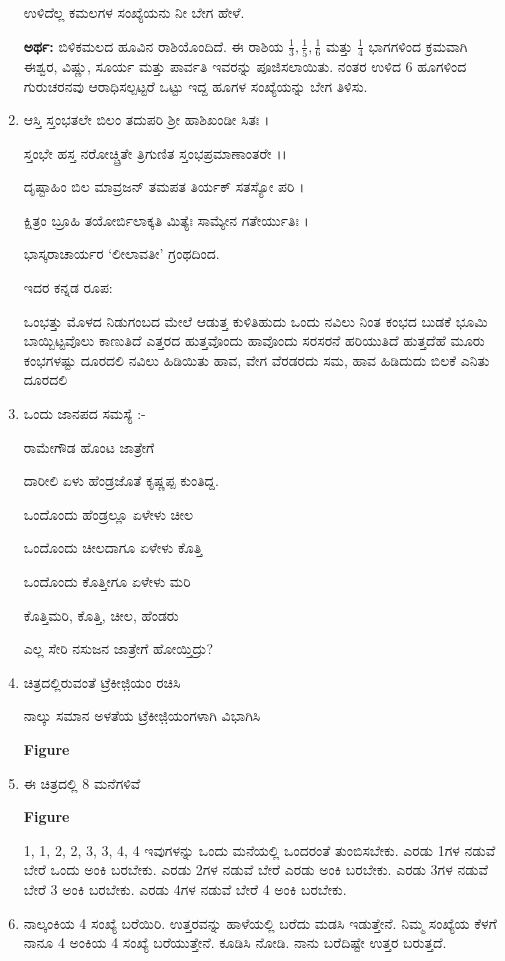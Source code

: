 \begin{enumerate}
 ಉಳಿದೆಲ್ಲ ಕಮಲಗಳ ಸಂಖ್ಯೆಯನು ನೀ ಬೇಗ ಹೇಳೆ.
 
 \smallskip
 {\bf ಅರ್ಥ:} ಬಿಳಿಕಮಲದ ಹೂವಿನ ರಾಶಿಯೊಂದಿದೆ. ಈ ರಾಶಿಯ $\frac{1}{3}, \frac{1}{5}, \frac{1}{6}$ ಮತ್ತು $\frac{1}{4}$ ಭಾಗಗಳಿಂದ ಕ್ರಮವಾಗಿ ಈಶ್ವರ, ವಿಷ್ಣು, ಸೂರ್ಯ ಮತ್ತು ಪಾರ್ವತಿ ಇವರನ್ನು ಪೂಜಿಸಲಾಯಿತು. ನಂತರ ಉಳಿದ 6 ಹೂಗಳಿಂದ ಗುರುಚರನವು ಆರಾಧಿಸಲ್ಪಟ್ಟರೆ ಒಟ್ಟು ಇದ್ದ ಹೂಗಳ ಸಂಖ್ಯೆಯನ್ನು ಬೇಗ ತಿಳಿಸು. 
 
 \item ಆಸ್ತಿ ಸ್ತಂಭತಲೇ ಬಿಲಂ ತದುಪರಿ ಶ್ರೀ ಹಾಶಿಖಂಡೀ ಸಿತಃ ।
 
 ಸ್ತಂಭೇ ಹಸ್ತ ನರೋಚ್ಚ್ರಿತೇ ತ್ರಿಗುಣಿತ ಸ್ತಂಭಪ್ರಮಾಣಾಂತರೇ ।।
 
 ದೃಷ್ಟಾಹಿಂ ಬಿಲ ಮಾವ್ರಜನ್ ತಮಪತ ತಿರ್ಯಕ್ ಸತಸ್ಯೋ ಪರಿ ।
 
 ಕ್ಷಿತ್ರಂ ಬ್ರೂಹಿ ತಯೋರ್ಬಿಲಾಕ್ಕತಿ ಮಿತ್ಯೆಃ ಸಾಮ್ಯೇನ ಗತೇರ್ಯುತಿಃ ।
 
 \hfill ಭಾಸ್ಕರಾಚಾರ್ಯರ ‘ಲೀಲಾವತೀ’ ಗ್ರಂಥದಿಂದ.
  
 \smallskip
 ಇದರ ಕನ್ನಡ ರೂಪ:
 
 ಒಂಭತ್ತು ಮೊಳದ ನಿಡುಗಂಬದ ಮೇಲೆ ಆಡುತ್ತ ಕುಳಿತಿಹುದು ಒಂದು ನವಿಲು ನಿಂತ ಕಂಭದ ಬುಡಕೆ ಭೂಮಿ ಬಾಯ್ಬಿಟ್ಟವೊಲು ಕಾಣುತಿದೆ ಎತ್ತರದ ಹುತ್ತವೊಂದು ಹಾವೊಂದು ಸರಸರನೆ ಹರಿಯುತಿದೆ ಹುತ್ತದೆಹೆ ಮೂರು ಕಂಭಗಳಷ್ಟು ದೂರದಲಿ ನವಿಲು ಹಿಡಿಯಿತು ಹಾವ, ವೇಗ ವೆರಡರದು ಸಮ, ಹಾವ ಹಿಡಿದುದು ಬಿಲಕೆ ಎನಿತು ದೂರದಲಿ
 
 \item ಒಂದು ಜಾನಪದ ಸಮಸ್ಯೆ :-
 
ರಾಮೇಗೌಡ ಹೊಂಟ ಜಾತ್ರೇಗೆ 
 
ದಾರೀಲಿ ಏಳು ಹೆಂಡ್ರಜೊತೆ ಕೃಷ್ಣಪ್ಪ ಕುಂತಿದ್ದ. 
 
ಒಂದೊಂದು ಹೆಂಡ್ರಲ್ಲೂ ಏಳೇಳು ಚೀಲ 
 
ಒಂದೊಂದು ಚೀಲದಾಗೂ ಏಳೇಳು ಕೊತ್ತಿ 
 
ಒಂದೊಂದು ಕೊತ್ತೀಗೂ ಏಳೇಳು ಮರಿ

ಕೊತ್ತಿಮರಿ, ಕೊತ್ತಿ, ಚೀಲ, ಹೆಂಡರು 

ಎಲ್ಲ ಸೇರಿ ನಸುಜನ ಜಾತ್ರೇಗೆ ಹೋಯ್ತಿದ್ರು? 

\item ಚಿತ್ರದಲ್ಲಿರುವಂತೆ ಟ್ರೆಕೀಜಿ಼ಯಂ ರಚಿಸಿ 

ನಾಲ್ಕು ಸಮಾನ ಅಳತೆಯ ಟ್ರೆಕೀಜಿ಼ಯಂಗಳಾಗಿ ವಿಭಾಗಿಸಿ 

\begin{center}
{\bf Figure}
\end{center}
 
 \item ಈ ಚಿತ್ರದಲ್ಲಿ 8 ಮನೆಗಳಿವೆ 
 
 \begin{center}
{\bf Figure}
\end{center}

1, 1, 2, 2, 3, 3, 4, 4 ಇವುಗಳನ್ನು ಒಂದು ಮನೆಯಲ್ಲಿ ಒಂದರಂತೆ ತುಂಬಿಸಬೇಕು. ಎರಡು 1ಗಳ ನಡುವೆ ಬೇರೆ ಒಂದು ಅಂಕಿ ಬರಬೇಕು. ಎರಡು 2ಗಳ ನಡುವೆ ಬೇರೆ ಎರಡು ಅಂಕಿ ಬರಬೇಕು. ಎರಡು 3ಗಳ ನಡುವೆ ಬೇರೆ 3 ಅಂಕಿ ಬರಬೇಕು. ಎರಡು 4ಗಳ ನಡುವೆ ಬೇರೆ 4 ಅಂಕಿ ಬರಬೇಕು.

\item ನಾಲ್ಕಂಕಿಯ 4 ಸಂಖ್ಯೆ ಬರೆಯಿರಿ. ಉತ್ತರವನ್ನು ಹಾಳೆಯಲ್ಲಿ ಬರೆದು ಮಡಸಿ ಇಡುತ್ತೇನೆ. ನಿಮ್ಮ ಸಂಖ್ಯೆಯ ಕೆಳಗೆ ನಾನೂ 4 ಅಂಕಿಯ 4 ಸಂಖ್ಯೆ ಬರೆಯುತ್ತೇನೆ. ಕೂಡಿಸಿ ನೋಡಿ. ನಾನು ಬರೆದಿಷ್ಟೇ ಉತ್ತರ ಬರುತ್ತದೆ. 
\end{enumerate}

